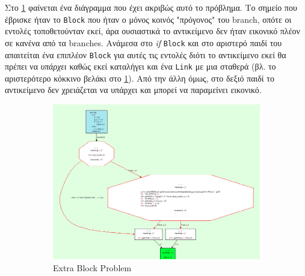 Στο \ref{figure-8:a} φαίνεται ένα διάγραμμα που έχει ακριβώς αυτό το πρόβλημα.
Το σημείο που έβρισκε ήταν το \texttt{Block} που ήταν ο μόνος κοινός "πρόγονος"
του branch, οπότε οι εντολές τοποθετούνταν εκεί, άρα ουσιαστικά το αντικείμενο
δεν ήταν εικονικό πλέον σε κανένα από τα branches. Ανάμεσα στο \textit{if}
\texttt{Block} και στο αριστερό παιδί του απαιτείται ένα επιπλέον \texttt{Block}
για αυτές τις εντολές διότι το αντικείμενο εκεί θα πρέπει να \textit{υπάρχει}
καθώς εκεί καταλήγει και ένα \texttt{Link} με μια σταθερά (βλ. το αριστερότερο
κόκκινο βελάκι στο \ref{figure-8:a}). Από την άλλη όμως, στο δεξιό παιδί το
αντικείμενο δεν χρειάζεται να υπάρχει και μπορεί να παραμείνει εικονικό.

\begin{figure}[h]
\begin{subfigure}{0.6\textwidth}
\centering
\includegraphics[width=\textwidth]{needs-extra-block-bef.png}
\caption{Extra Block Problem}
\label{figure-8:a}
\end{subfigure}
\begin{subfigure}{0.4\textwidth}
\centering

\end{subfigure}
\end{figure}
